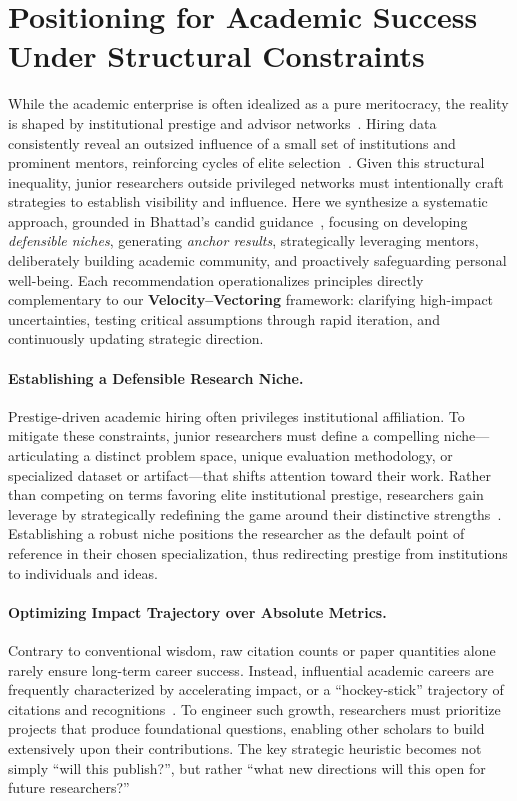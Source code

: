 
\section{Positioning for Academic Success Under Structural Constraints}
\label{sec:academic_positioning}

While the academic enterprise is often idealized as a pure meritocracy, the reality is shaped by institutional prestige and advisor networks~\citep{bhattad2025jrgrads}.
Hiring data consistently reveal an outsized influence of a small set of institutions and prominent mentors, reinforcing cycles of elite selection~\citep{clauset2015systematic}.
Given this structural inequality, junior researchers outside privileged networks must intentionally craft strategies to establish visibility and influence.
Here we synthesize a systematic approach, grounded in Bhattad's candid guidance~\citep{bhattad2025jrgrads}, focusing on developing \emph{defensible niches}, generating \emph{anchor results}, strategically leveraging mentors, deliberately building academic community, and proactively safeguarding personal well-being.
Each recommendation operationalizes principles directly complementary to our \textbf{Velocity--Vectoring} framework: clarifying high-impact uncertainties, testing critical assumptions through rapid iteration, and continuously updating strategic direction.

\paragraph{Establishing a Defensible Research Niche.}
Prestige-driven academic hiring often privileges institutional affiliation.
To mitigate these constraints, junior researchers must define a compelling niche---articulating a distinct problem space, unique evaluation methodology, or specialized dataset or artifact---that shifts attention toward their work.
Rather than competing on terms favoring elite institutional prestige, researchers gain leverage by strategically redefining the game around their distinctive strengths~\citep{bhattad2025jrgrads}.
Establishing a robust niche positions the researcher as the default point of reference in their chosen specialization, thus redirecting prestige from institutions to individuals and ideas.

\paragraph{Optimizing Impact Trajectory over Absolute Metrics.}
Contrary to conventional wisdom, raw citation counts or paper quantities alone rarely ensure long-term career success.
Instead, influential academic careers are frequently characterized by accelerating impact, or a ``hockey-stick'' trajectory of citations and recognitions~\citep{bhattad2025jrgrads}.
To engineer such growth, researchers must prioritize projects that produce foundational questions, enabling other scholars to build extensively upon their contributions.
The key strategic heuristic becomes not simply ``will this publish?'', but rather ``what new directions will this open for future researchers?''

